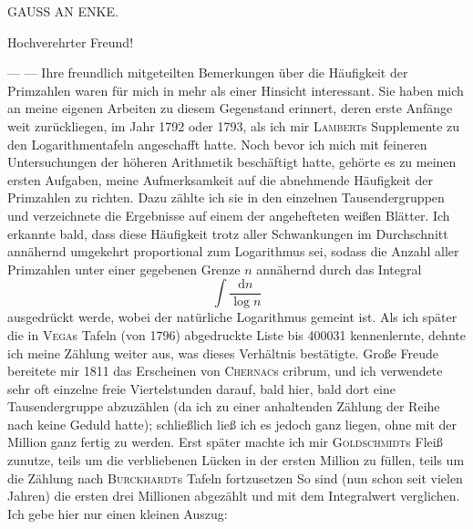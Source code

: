 \clearpage
{}%
\renewcommand{\BookRunningTitle}{Gauss an Enke}
\begingroup{}
\begin{center}{\large GAUSS AN ENKE.}\end{center}
\begin{center}Hochverehrter Freund!\end{center}

— — Ihre freundlich mitgeteilten Bemerkungen über die Häufigkeit der Primzahlen waren für mich in mehr als einer Hinsicht interessant. Sie haben mich an meine eigenen Arbeiten zu diesem Gegenstand erinnert, deren erste Anfänge weit zurückliegen, im Jahr 1792 oder 1793, als ich mir \textsc{Lambert}s Supplemente zu den Logarithmentafeln angeschafft hatte. Noch bevor ich mich mit feineren Untersuchungen der höheren Arithmetik beschäftigt hatte, gehörte es zu meinen ersten Aufgaben, meine Aufmerksamkeit auf die abnehmende Häufigkeit der Primzahlen zu richten. Dazu zählte ich sie in den einzelnen Tausendergruppen und verzeichnete die Ergebnisse auf einem der angehefteten weißen Blätter. Ich erkannte bald, dass diese Häufigkeit trotz aller Schwankungen im Durchschnitt annähernd umgekehrt proportional zum Logarithmus sei, sodass die Anzahl aller Primzahlen unter einer gegebenen Grenze $n$ annähernd durch das Integral
\[
\int\frac{\mathrm{d}n}{\log n}
\]
ausgedrückt werde, wobei der natürliche Logarithmus gemeint ist. Als ich später die in \textsc{Vega}s Tafeln (von 1796) abgedruckte Liste bis 400031 kennenlernte, dehnte ich meine Zählung weiter aus, was dieses Verhältnis bestätigte. Große Freude bereitete mir 1811 das Erscheinen von \textsc{Chernac}s
%
cribrum, und ich verwendete sehr oft einzelne freie Viertelstunden darauf, bald hier, bald dort eine Tausendergruppe abzuzählen (da ich zu einer anhaltenden Zählung der Reihe nach keine Geduld hatte); schließlich ließ ich es jedoch ganz liegen, ohne mit der Million ganz fertig zu werden. Erst später machte ich mir \textsc{Goldschmidt}s Fleiß zunutze, teils um die verbliebenen Lücken in der ersten Million zu füllen, teils um die Zählung nach \textsc{Burck\-hardt}s Tafeln fortzusetzen So sind (nun schon seit vielen Jahren) die ersten drei Millionen abgezählt und mit dem Integralwert verglichen. Ich gebe hier nur einen kleinen Auszug:

